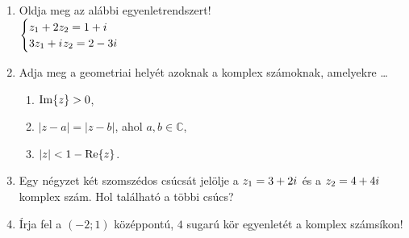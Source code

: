 \documentclass[a4paper, 12pt]{scrartcl}
\begin{document}
\begin{enumerate}
  \item Oldja meg az alábbi egyenletrendszert!\\[2mm]
        \hspace{2ex}$
          \begin{cases}
            z_1 + 2z_2 = 1 + {i\mkern1mu}    \\
            3z_1 + {i\mkern1mu} z_2 = 2 - 3i \\
          \end{cases}
        $

  \item Adja meg a geometriai helyét azoknak a komplex számoknak, amelyekre
        \dots
        \begin{enumerate}
          \item $\operatorname{Im} \{ z \} > 0$,
          \item $|z - a| = |z - b|$, ahol $a, b \in \mathbb C$,
          \item $|z| < 1 - \operatorname{Re} \{ z \}$.
        \end{enumerate}

  \item Egy négyzet két szomszédos csúcsát jelölje a $z_1 = 3 + 2 {i\mkern1mu}$ és a
        $z_2 = 4 + 4 {i\mkern1mu}$ komplex szám. Hol található a többi csúcs?

  \item Írja fel a $(-2; 1)$ középpontú, $4$ sugarú kör egyenletét a komplex
        számsíkon!
\end{enumerate}

\end{document}
